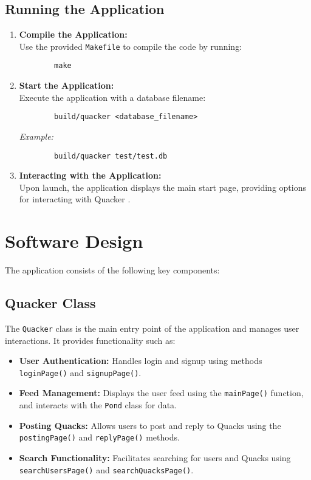 \documentclass[12pt]{article}
\begin{document}
  \subsection*{Running the Application}
	\begin{enumerate}
		\item \textbf{Compile the Application:} \\
		Use the provided \texttt{Makefile} to compile the code by running:
		\begin{verbatim}
		make
		\end{verbatim}
		\item \textbf{Start the Application:} \\
		Execute the application with a database filename:
		\begin{verbatim}
		build/quacker <database_filename>
		\end{verbatim}
		\textit{Example:}
		\begin{verbatim}
		build/quacker test/test.db
		\end{verbatim}
		\item \textbf{Interacting with the Application:} \\
		Upon launch, the application displays the main start page, providing options for interacting with Quacker .
	\end{enumerate}
\newpage

\section{Software Design}
The application consists of the following key components:

	\subsection*{Quacker Class}
	The \texttt{Quacker} class is the main entry point of the application and manages user interactions. It provides functionality such as:
	\begin{itemize}
		\item \textbf{User Authentication:} Handles login and signup using methods \texttt{loginPage()} and \texttt{signupPage()}.
		\item \textbf{Feed Management:} Displays the user feed using the \texttt{mainPage()} function, and interacts with the \texttt{Pond} class for data.
		\item \textbf{Posting Quacks:} Allows users to post and reply to Quacks using the \texttt{postingPage()} and \texttt{replyPage()} methods.
		\item \textbf{Search Functionality:} Facilitates searching for users and Quacks using \texttt{searchUsersPage()} and \texttt{searchQuacksPage()}.
	\end{itemize}
\end{document}
